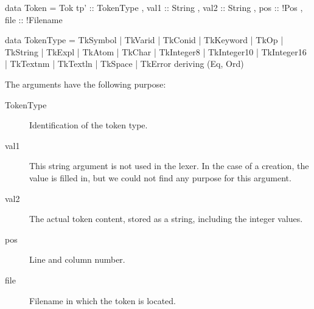 \begin{haskell}
data Token = Tok { tp' :: TokenType
                 , val1 :: String
                 , val2 :: String
                 , pos :: !Pos
                 , file :: !Filename
                 }

data TokenType
  = TkSymbol
  | TkVarid
  | TkConid
  | TkKeyword
  | TkOp
  | TkString
  | TkExpl
  | TkAtom
  | TkChar
  | TkInteger8
  | TkInteger10
  | TkInteger16
  | TkTextnm
  | TkTextln
  | TkSpace
  | TkError
  deriving (Eq, Ord)
\end{haskell}
%
The arguments have the following purpose:
\begin{description}
  \item[TokenType]
    Identification of the token type. %
  \item[val1]
    This string argument is not used in the lexer.
    In the case of a  creation, the value is filled in, but we could not find any purpose for this argument.
  \item[val2]
    The actual token content, stored as a string, including the integer values.
  \item[pos]
    Line and column number.
  \item[file]
     Filename in which the token is located.
\end{description}
